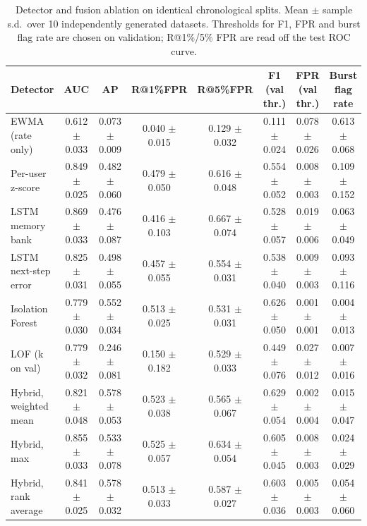 \begin{table}[t]
\centering
\small
\caption{Detector and fusion ablation on identical chronological splits. Mean $\pm$ sample s.d.\ over 10 independently generated datasets. Thresholds for F1, FPR and burst flag rate are chosen on validation; R@1\%/5\% FPR are read off the test ROC curve.}
\label{tab:ablation}
\begin{tabular}{lccccccc}
\hline
Detector & AUC & AP & R@1\%FPR & R@5\%FPR & F1 (val thr.) & FPR (val thr.) & Burst flag rate \\
\hline
EWMA (rate only) & 0.612 $\pm$ 0.033 & 0.073 $\pm$ 0.009 & 0.040 $\pm$ 0.015 & 0.129 $\pm$ 0.032 & 0.111 $\pm$ 0.024 & 0.078 $\pm$ 0.026 & 0.613 $\pm$ 0.068 \\
Per-user z-score & 0.849 $\pm$ 0.025 & 0.482 $\pm$ 0.060 & 0.479 $\pm$ 0.050 & 0.616 $\pm$ 0.048 & 0.554 $\pm$ 0.052 & 0.008 $\pm$ 0.003 & 0.109 $\pm$ 0.152 \\
LSTM memory bank & 0.869 $\pm$ 0.033 & 0.476 $\pm$ 0.087 & 0.416 $\pm$ 0.103 & 0.667 $\pm$ 0.074 & 0.528 $\pm$ 0.057 & 0.019 $\pm$ 0.006 & 0.063 $\pm$ 0.049 \\
LSTM next-step error & 0.825 $\pm$ 0.031 & 0.498 $\pm$ 0.055 & 0.457 $\pm$ 0.055 & 0.554 $\pm$ 0.031 & 0.538 $\pm$ 0.040 & 0.009 $\pm$ 0.003 & 0.093 $\pm$ 0.116 \\
Isolation Forest & 0.779 $\pm$ 0.030 & 0.552 $\pm$ 0.034 & 0.513 $\pm$ 0.025 & 0.531 $\pm$ 0.031 & 0.626 $\pm$ 0.050 & 0.001 $\pm$ 0.001 & 0.004 $\pm$ 0.013 \\
LOF (k on val) & 0.779 $\pm$ 0.032 & 0.246 $\pm$ 0.081 & 0.150 $\pm$ 0.182 & 0.529 $\pm$ 0.033 & 0.449 $\pm$ 0.076 & 0.027 $\pm$ 0.012 & 0.007 $\pm$ 0.016 \\
Hybrid, weighted mean & 0.821 $\pm$ 0.048 & 0.578 $\pm$ 0.053 & 0.523 $\pm$ 0.038 & 0.565 $\pm$ 0.067 & 0.629 $\pm$ 0.054 & 0.002 $\pm$ 0.004 & 0.015 $\pm$ 0.047 \\
Hybrid, max & 0.855 $\pm$ 0.033 & 0.533 $\pm$ 0.078 & 0.525 $\pm$ 0.057 & 0.634 $\pm$ 0.054 & 0.605 $\pm$ 0.045 & 0.008 $\pm$ 0.003 & 0.024 $\pm$ 0.029 \\
Hybrid, rank average & 0.841 $\pm$ 0.025 & 0.578 $\pm$ 0.032 & 0.513 $\pm$ 0.033 & 0.587 $\pm$ 0.027 & 0.603 $\pm$ 0.036 & 0.005 $\pm$ 0.003 & 0.054 $\pm$ 0.060 \\
\hline
\end{tabular}
\end{table}
